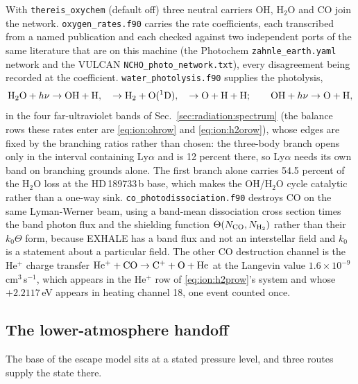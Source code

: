 With \texttt{thereis\_oxychem} (default off) three neutral carriers OH,
H$_2$O and CO join the network. \texttt{oxygen\_rates.f90} carries the rate
coefficients, each transcribed from a named publication and each checked
against two independent ports of the same literature that are on this
machine (the Photochem \texttt{zahnle\_earth.yaml} network and the VULCAN
\texttt{NCHO\_photo\_network.txt}), every disagreement being recorded at the
coefficient. \texttt{water\_photolysis.f90} supplies the photolysis,
\[
{\rm H_2O}+h\nu\to{\rm OH}+{\rm H},\quad
\to{\rm H_2}+{\rm O}(^1{\rm D}),\quad
\to{\rm O}+{\rm H}+{\rm H};
\qquad
{\rm OH}+h\nu\to{\rm O}+{\rm H},
\]
in the four far-ultraviolet bands of Sec.~\ref{sec:radiation:spectrum}
(the balance rows these rates enter are \eqref{eq:ion:ohrow} and
\eqref{eq:ion:h2orow}), whose
edges are fixed by the branching ratios rather than chosen: the three-body
branch opens only in the interval containing Ly$\alpha$ and is 12 percent
there, so Ly$\alpha$ needs its own band on branching grounds alone. The first
branch alone carries 54.5 percent of the H$_2$O loss at the HD\,189733\,b
base, which makes the OH/H$_2$O cycle catalytic rather than a one-way sink.
\texttt{co\_photodissociation.f90} destroys CO on the same Lyman-Werner beam,
using a band-mean dissociation cross section times the band photon flux and
the \citet{Visser2009} shielding function
$\Theta(N_{\rm CO},N_{\rm H_2})$ rather than their $k_0\Theta$ form, because
EXHALE has a band flux and not an interstellar field and $k_0$ is a statement
about a particular field. The other CO destruction channel is the He$^+$
charge transfer
${\rm He^+}+{\rm CO}\to{\rm C^+}+{\rm O}+{\rm He}$ at the Langevin value
$1.6\times10^{-9}$\,cm$^{3}$\,s$^{-1}$, which appears in the He$^+$ row of
\eqref{eq:ion:h2prow}'s system and whose $+2.2117$\,eV appears in heating
channel 18, one event counted once.

\subsection{The lower-atmosphere handoff}
\label{sec:mol:handoff}

The base of the escape model sits at a stated pressure level, and three
routes supply the state there.


